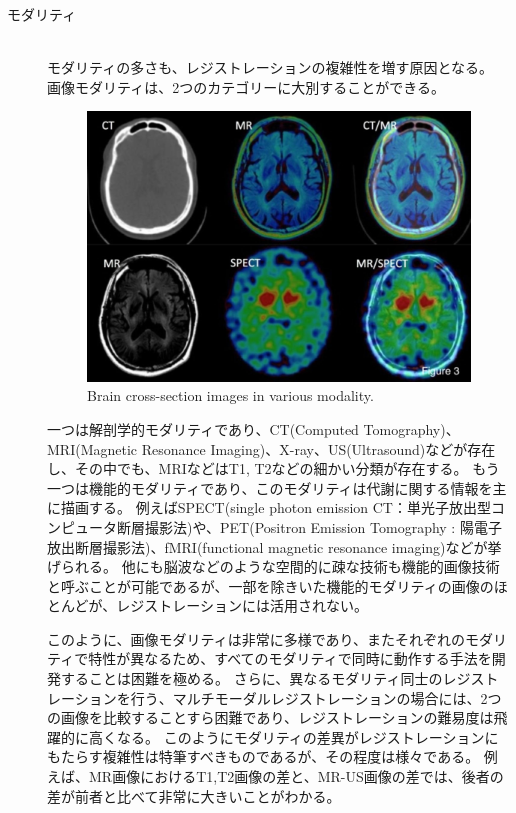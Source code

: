 \begin{description}
        \item[モダリティ]\mbox{}\\
            モダリティの多さも、レジストレーションの複雑性を増す原因となる。
            画像モダリティは、2つのカテゴリーに大別することができる。
            \begin{figure}[ht]
              \centering
              \includegraphics[width=12cm]{1_intro/img/MRCTSPECT.jpg}
              \caption{Brain cross-section images in various modality\cite{hara2016spect}.}
            \end{figure}
            一つは解剖学的モダリティであり、CT(Computed Tomography)、MRI(Magnetic Resonance Imaging)、X-ray、US(Ultrasound)などが存在し、その中でも、MRIなどはT1, T2などの細かい分類が存在する\cite{maintz1998survey}。
            もう一つは機能的モダリティであり、このモダリティは代謝に関する情報を主に描画する。
            例えばSPECT(single photon emission CT：単光子放出型コンピュータ断層撮影法)や、PET(Positron Emission Tomography : 陽電子放出断層撮影法)、fMRI(functional magnetic resonance imaging)などが挙げられる。
            他にも脳波などのような空間的に疎な技術も機能的画像技術と呼ぶことが可能であるが、一部を除きいた機能的モダリティの画像のほとんどが、レジストレーションには活用されない。
    
            このように、画像モダリティは非常に多様であり、またそれぞれのモダリティで特性が異なるため、すべてのモダリティで同時に動作する手法を開発することは困難を極める。
            さらに、異なるモダリティ同士のレジストレーションを行う、マルチモーダルレジストレーションの場合には、2つの画像を比較することすら困難であり、レジストレーションの難易度は飛躍的に高くなる。
            このようにモダリティの差異がレジストレーションにもたらす複雑性は特筆すべきものであるが、その程度は様々である。
            例えば、MR画像におけるT1,T2画像の差と、MR-US画像の差では、後者の差が前者と比べて非常に大きいことがわかる。
    

\end{description}
